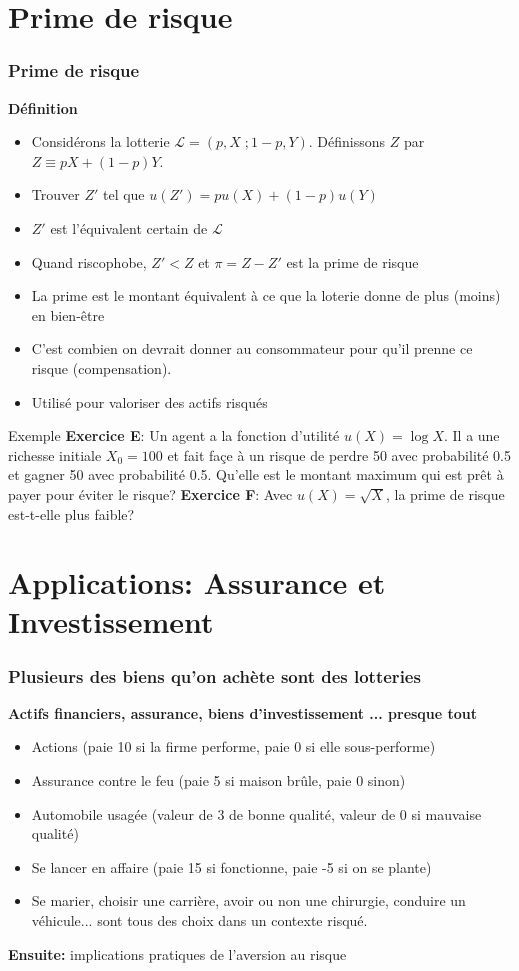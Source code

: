 \documentclass[handout]{beamer}
\newenvironment{iPar}[1]{\textbf{#1} \begin{itemize}}{\end{itemize}}
\newcommand{\mdp}{\medskip \pause}
\newcommand{\mc}{\mathcal}
\begin{document}
\section{Prime de risque}

\begin{frame}\frametitle{Prime de risque}

\begin{iPar}{Définition} \item Considérons la lotterie $\mc L =
(p,X\;;1-p,Y)$. Définissons $Z$ par $Z \equiv pX+ (1-p)Y$. \item Trouver $Z'$ tel que $u(Z') = pu(X) + (1-p)u(Y)$ \item $Z'$ est l'équivalent certain de $\mc L$ \item Quand riscophobe, $Z' < Z$ et $
\pi = Z-Z'$ est la prime de risque \item La prime est le montant équivalent à ce que la loterie donne de plus (moins) en bien-être \item C'est combien on devrait donner au consommateur pour qu'il prenne ce risque (compensation).
\item Utilisé pour valoriser des actifs risqués
\end{iPar}

\end{frame}

\begin{frame}{Exemple}
\textbf{Exercice E}: Un agent a la fonction d'utilité $u(X)=\log X$. Il a une richesse initiale $X_0 = 100$ et fait façe à un risque de perdre 50 avec probabilité 0.5 et gagner 50 avec probabilité 0.5. Qu'elle est le montant maximum qui est prêt à payer pour éviter le risque?
\textbf{Exercice F}: Avec $u(X) = \sqrt X $, la prime de risque est-t-elle plus faible?
\end{frame}


\section{Applications: Assurance et Investissement}

\begin{frame}\frametitle{Plusieurs des biens qu'on achète sont des lotteries}
\begin{iPar}{Actifs financiers, assurance, biens d'investissement ...
presque tout} \item Actions (paie 10 si la firme performe, paie 0 si elle sous-performe) \item Assurance contre le feu (paie 5 si maison brûle, paie 0
sinon) \item Automobile usagée (valeur de 3 de bonne qualité, valeur de 0 si mauvaise qualité) \item
Se lancer en affaire (paie 15 si fonctionne, paie -5 si on se plante) \item Se marier, choisir une carrière, avoir ou non une chirurgie, conduire un véhicule... sont tous des choix dans un contexte risqué. \end{iPar} \mdp \textbf{Ensuite:} implications pratiques de l'aversion au risque \end{frame}
\end{document}
